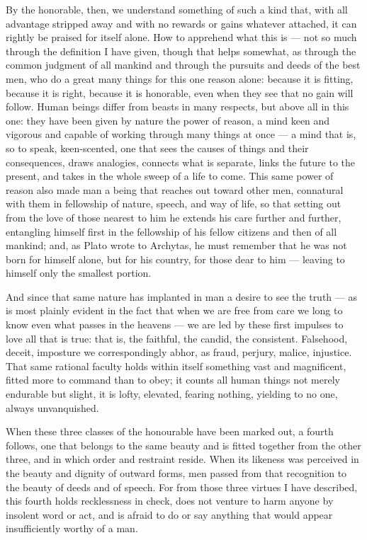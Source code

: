  By the honorable, then, we understand something of such a kind that, with all advantage stripped away and with no rewards or gains whatever attached, it can rightly be praised for itself alone. How to apprehend what this is — not so much through the definition I have given, though that helps somewhat, as through the common judgment of all mankind and through the pursuits and deeds of the best men, who do a great many things for this one reason alone: because it is fitting, because it is right, because it is honorable, even when they see that no gain will follow. Human beings differ from beasts in many respects, but above all in this one: they have been given by nature the power of reason, a mind keen and vigorous and capable of working through many things at once — a mind that is, so to speak, keen-scented, one that sees the causes of things and their consequences, draws analogies, connects what is separate, links the future to the present, and takes in the whole sweep of a life to come. This same power of reason also made man a being that reaches out toward other men, connatural with them in fellowship of nature, speech, and way of life, so that setting out from the love of those nearest to him he extends his care further and further, entangling himself first in the fellowship of his fellow citizens and then of all mankind; and, as Plato wrote to Archytas, he must remember that he was not born for himself alone, but for his country, for those dear to him — leaving to himself only the smallest portion.


 And since that same nature has implanted in man a desire to see the truth — as is most plainly evident in the fact that when we are free from care we long to know even what passes in the heavens — we are led by these first impulses to love all that is true: that is, the faithful, the candid, the consistent. Falsehood, deceit, imposture we correspondingly abhor, as fraud, perjury, malice, injustice. That same rational faculty holds within itself something vast and magnificent, fitted more to command than to obey; it counts all human things not merely endurable but slight, it is lofty, elevated, fearing nothing, yielding to no one, always unvanquished.

 When these three classes of the honourable have been marked out, a fourth follows, one that belongs to the same beauty and is fitted together from the other three, and in which order and restraint reside. When its likeness was perceived in the beauty and dignity of outward forms, men passed from that recognition to the beauty of deeds and of speech. For from those three virtues I have described, this fourth holds recklessness in check, does not venture to harm anyone by insolent word or act, and is afraid to do or say anything that would appear insufficiently worthy of a man.

